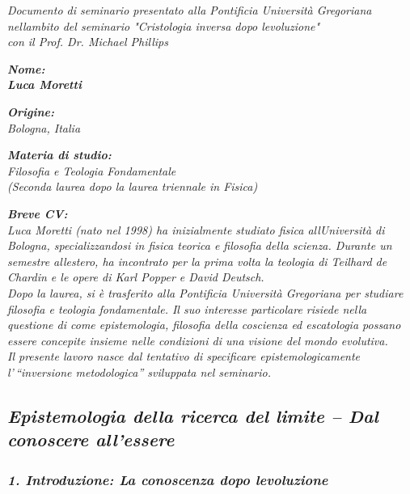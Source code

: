 \documentclass[
]{article}
\begin{document}
\emph{Documento di seminario presentato alla Pontificia Università Gregoriana\\
nell\textquotesingle ambito del seminario "Cristologia inversa dopo l\textquotesingle evoluzione"\\
con il Prof. Dr. Michael Phillips}

\emph{\textbf{Nome:\\
Luca Moretti}}

\emph{\textbf{Origine:\\
}Bologna, Italia}

\emph{\textbf{Materia di studio:\\
}Filosofia e Teologia Fondamentale\\
(Seconda laurea dopo la laurea triennale in Fisica)}

\emph{\textbf{Breve CV:\\
}Luca Moretti (nato nel 1998) ha inizialmente studiato fisica all\textquotesingle Università di Bologna, specializzandosi in fisica teorica e filosofia della scienza. Durante un semestre all\textquotesingle estero, ha incontrato per la prima volta la teologia di Teilhard de Chardin e le opere di Karl Popper e David Deutsch.\\
Dopo la laurea, si è trasferito alla Pontificia Università Gregoriana per studiare filosofia e teologia fondamentale. Il suo interesse particolare risiede nella questione di come epistemologia, filosofia della coscienza ed escatologia possano essere concepite insieme nelle condizioni di una visione del mondo evolutiva.\\
Il presente lavoro nasce dal tentativo di specificare epistemologicamente l'\,``inversione metodologica'' sviluppata nel seminario.}

\subsection{\texorpdfstring{\emph{\textbf{Epistemologia della ricerca del limite -- Dal conoscere all'essere}}}{Epistemologia della ricerca del limite -- Dal conoscere all'essere}}\label{epistemologia-della-ricerca-del-limite-dal-conoscere-allessere}

\subsubsection{\texorpdfstring{\emph{\textbf{1. Introduzione: La conoscenza dopo l\textquotesingle evoluzione}}}{1. Introduzione: La conoscenza dopo l\textquotesingle evoluzione}}\label{introduzione-la-conoscenza-dopo-levoluzione}
\end{document}
